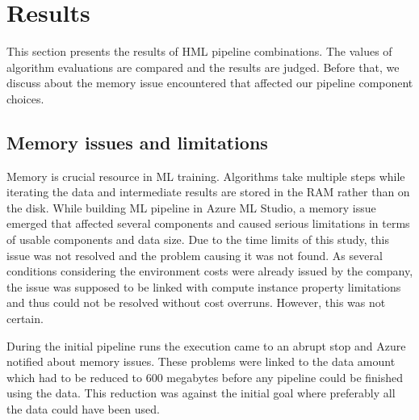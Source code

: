 

\section{Results}\label{sec:results}

This section presents the results of HML pipeline combinations.
The values of algorithm evaluations are compared
and the results are judged.
Before that,
we discuss about the memory issue encountered
that affected our pipeline component choices.




\subsection{Memory issues and limitations}\label{subsec:res-memory-issues}
Memory is crucial resource in ML training.
Algorithms take multiple steps while iterating the data
and intermediate results are stored in the RAM rather than on the disk.
While building ML pipeline in Azure ML Studio,
a memory issue emerged
that affected several components
and caused serious limitations
in terms of usable components and data size.
Due to the time limits of this study,
this issue was not resolved
and the problem causing it was not found.
As several conditions
considering the environment costs
were already issued by the company,
the issue was supposed to be linked with
compute instance property limitations
and thus could not be resolved without cost overruns.
However, this was not certain.




During the initial pipeline runs
the execution came to an abrupt stop
and Azure notified about memory issues. %
These problems were linked to the data amount
which had to be reduced to 600 megabytes
before any pipeline could be finished using the data.
This reduction was against the initial goal
where preferably all the data could have been used.


